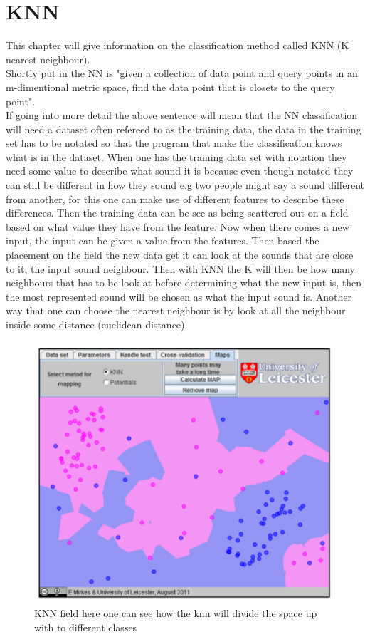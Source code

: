 \section{KNN}
This chapter will give information on the classification method called KNN (K nearest neighbour).\\
Shortly put in \citep{meaningfulNN} the NN is "given a collection of data point and query points in an m-dimentional metric space, find the data point that is closets to the query point".\\
If going into more detail the above sentence will mean that the NN classification will need a dataset often refereed to as the training data, the data in the training set has to be notated so that the program that make the classification knows what is in the dataset. When one has the training data set with notation they need some value to describe what sound it is  because even though notated they can still be different in how they sound e.g two people might say a sound different from another, for this one can make use of different features to describe these differences. Then the training data can be see as being scattered out on a field based on what value they have from the feature. Now when there comes a new input, the input can be given a value from the features. Then based the placement on the field the new data get it can look at the sounds that are close to it, the input sound neighbour. Then with KNN the K will then be how many neighbours that has to be look at before determining what the new input is, then the most represented sound will be chosen as what the input sound is. Another way that one can choose the nearest neighbour is by look at all the neighbour inside some distance (euclidean distance)\citep{NNHD}.
\begin{figure}[h]
	\begin{center}
		\includegraphics[scale = 0.5]{fig/KNNfig.jpg}
		\caption{KNN field here one can see how the knn will divide the space up with to different classes \citep{introKNN}}
		\label{KNN fig}
	\end{center}
\end{figure}
